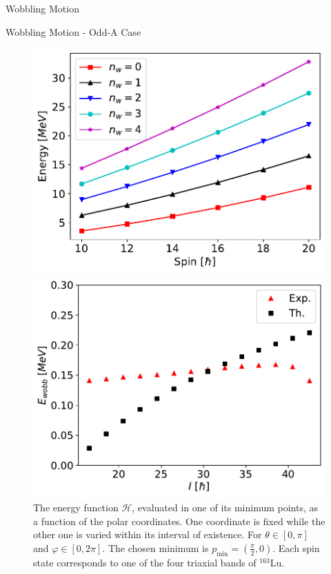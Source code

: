 \documentclass[final]{beamer}
\newlength{\colwidth}
\begin{document}
\begin{frame}[t]
\begin{columns}[t]
\begin{column}{\colwidth}
\begin{block}{Wobbling Motion}
  \end{block}
  
    \begin{block}{Wobbling Motion - Odd-A Case}
 \begin{figure}
\centering
\begin{minipage}{.5\textwidth}
  \centering
  \includegraphics[scale=0.8]{images/simple_wobbling_spectrum.pdf}
\end{minipage}%
\begin{minipage}{.5\textwidth}
  \centering
 \includegraphics[scale=0.8]{images/wobbling_energy_ThExp.pdf}
\end{minipage}
\caption{The energy function $\mathcal{H}$, evaluated in one of its minimum points, as a function of the polar coordinates. One coordinate is fixed while the other one is varied within its interval of existence. For $\theta\in[0,\pi]$ and $\varphi\in[0,2\pi]$. The chosen minimum is $p_\text{min}=\left(\frac{\pi}{2},0\right)$. Each spin state corresponds to one of the four triaxial bands of $^{163}$Lu.}
    \label{energy-function-min-point-evolution}
\end{figure}
  \end{block}


\end{column}
\end{columns}
\end{frame}
\end{document}

